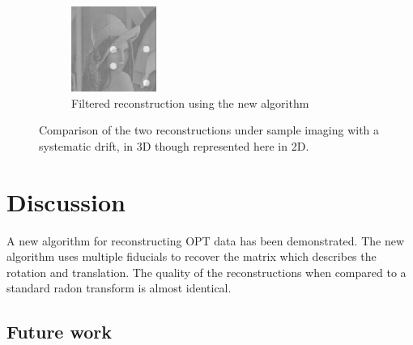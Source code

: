 \begin{figure}
\begin{subfigure}[t]{0.3\textwidth}
    \includegraphics[width=\textwidth]{Chapters/flopt/Figs/PDF/results/helix/filtered_recon_helix}
    \caption{Filtered reconstruction using the new algorithm}
    \label{fig:filtered_recon_helix}
  \end{subfigure}
    \hfill
    \label{fig:flopts}
  \caption{Comparison of the two reconstructions under sample imaging with a systematic drift, in 3D though represented here in 2D.}
\end{figure}





\section{Discussion}



A new algorithm for reconstructing OPT data has been demonstrated.
The new algorithm uses multiple fiducials to recover the matrix which describes the rotation and translation.
The quality of the reconstructions when compared to a standard radon transform is almost identical.

\subsection{Future work}

